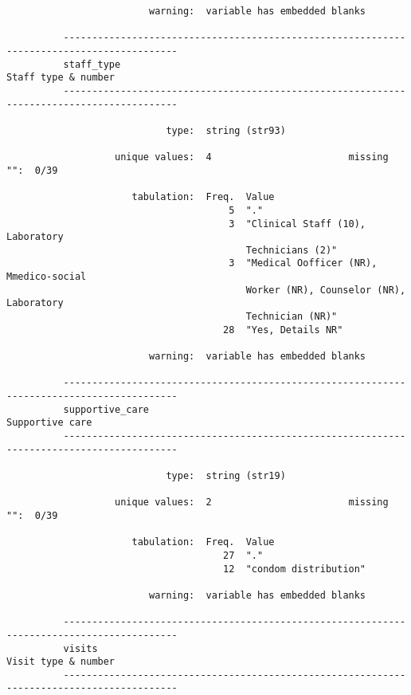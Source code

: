 \documentclass{article}
\begin{document}
\begin{verbatim}
                         warning:  variable has embedded blanks
          
          ------------------------------------------------------------------------------------------
          staff_type                                                             Staff type & number
          ------------------------------------------------------------------------------------------
          
                            type:  string (str93)
          
                   unique values:  4                        missing "":  0/39
          
                      tabulation:  Freq.  Value
                                       5  "."
                                       3  "Clinical Staff (10), Laboratory
                                          Technicians (2)"
                                       3  "Medical Oofficer (NR), Mmedico-social
                                          Worker (NR), Counselor (NR), Laboratory
                                          Technician (NR)"
                                      28  "Yes, Details NR"
          
                         warning:  variable has embedded blanks
          
          ------------------------------------------------------------------------------------------
          supportive_care                                                            Supportive care
          ------------------------------------------------------------------------------------------
          
                            type:  string (str19)
          
                   unique values:  2                        missing "":  0/39
          
                      tabulation:  Freq.  Value
                                      27  "."
                                      12  "condom distribution"
          
                         warning:  variable has embedded blanks
          
          ------------------------------------------------------------------------------------------
          visits                                                                 Visit type & number
          ------------------------------------------------------------------------------------------
          

\end{verbatim}
\end{document}
